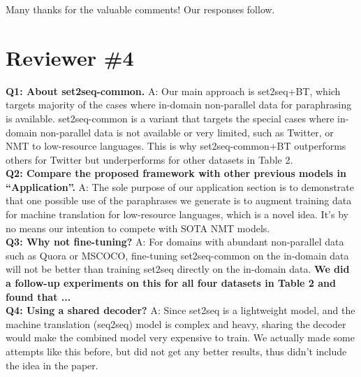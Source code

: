 \documentclass{article}
\begin{document}
Many thanks for the valuable comments! Our responses follow.
 
\section{Reviewer \#4}
\label{sec:review1}
\textbf{Q1: About set2seq-common.}
A: Our main approach is set2seq+BT, which targets majority of the cases
where in-domain non-parallel data for paraphrasing is available. 
set2seq-common is a variant that targets the special cases where in-domain
non-parallel data is not available or very limited, such as Twitter, or
NMT to low-resource languages. This is why set2seq-common+BT outperforms
others for Twitter but underperforms for other datasets in Table 2.\\
\textbf{Q2: Compare the proposed framework with other previous models in 
``Application''.}
A: The sole purpose of our application section is to demonstrate that 
one possible use of the paraphrases we generate is to augment training data for 
machine translation for low-resource languages, which is a novel idea. 
It's by no means our intention to compete with SOTA NMT models.\\
\textbf{Q3: Why not fine-tuning?}
A: For domains with abundant non-parallel data such as Quora or MSCOCO,
fine-tuning set2seq-common on the in-domain data will not be better than
training set2seq directly on the in-domain data. \textbf{We did a follow-up
experiments on this for all four datasets in Table 2 and found that ...}\\
\textbf{Q4: Using a shared decoder?}
A: Since set2seq is a lightweight model, and the machine translation (seq2seq) 
model is complex and heavy, sharing the decoder would make the combined model 
very expensive to train. We actually made some attempts like this before, but
did not get any better results, thus didn't include the idea in the paper.
\end{document}
